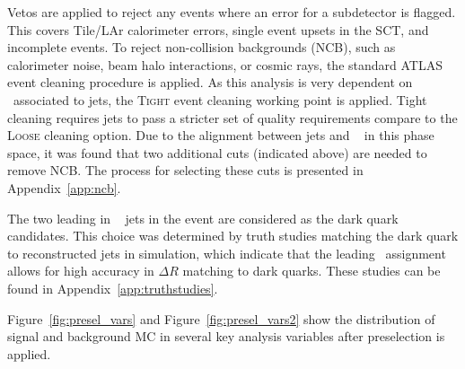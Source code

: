 Vetos are applied to reject any events where an error for a subdetector is flagged. 
This covers Tile/LAr calorimeter errors, single event upsets in the SCT, and incomplete events.
To reject non-collision backgrounds (NCB), such as calorimeter noise, beam halo interactions, or cosmic rays, the standard ATLAS event cleaning procedure is applied.
As this analysis is very dependent on \met~associated to jets, the \textsc{Tight} event cleaning working point is applied. 
Tight cleaning requires jets to pass a stricter set of quality requirements compare to the \textsc{Loose} cleaning option.
Due to the alignment between jets and \met~ in this phase space, it was found that two additional cuts (indicated above) are needed to remove NCB.
The process for selecting these cuts is presented in Appendix~\ref{app:ncb}. 

The two leading in \pt~ jets in the event are considered as the dark quark candidates.
This choice was determined by truth studies matching the dark quark to reconstructed jets in simulation, which indicate that the leading \pt~assignment allows for high accuracy in $\Delta R$ matching to dark quarks.
These studies can be found in Appendix~\ref{app:truthstudies}.

Figure~\ref{fig:presel_vars} and Figure~\ref{fig:presel_vars2} show the distribution of signal and background MC in several key analysis variables after preselection is applied.


